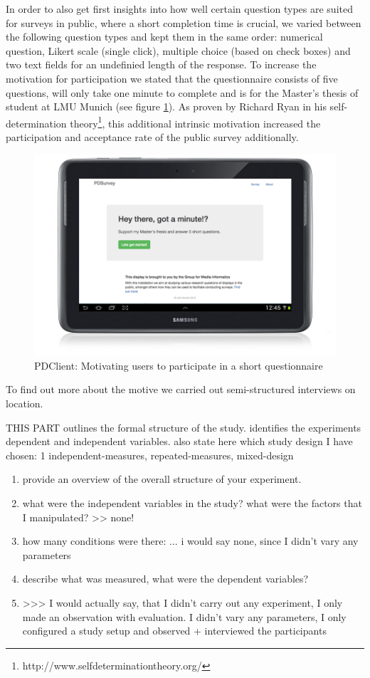 	In order to also get first insights into how well certain question types are suited for surveys in public, where a short completion time is crucial, we varied between the following question types and kept them in the same order: numerical question, Likert scale (single click), multiple choice (based on check boxes) and two text fields for an undefinied length of the response. To increase the motivation for participation we stated that the questionnaire consists of five questions, will only take one minute to complete and is for the Master's thesis of student at LMU Munich (see figure \ref{fig:5-pdclient-intro}).
	As proven by Richard Ryan in his self-determination theory\cite{ryan2000self}\footnote{http://www.selfdeterminationtheory.org/}, this additional intrinsic motivation increased the participation and acceptance rate of the public survey additionally. 

	\begin{figure}
	    \begin{center}
	        \includegraphics[width=.7\columnwidth]{img/5_field-study/pdclient-startscreen.png}
	    \end{center}
	 \caption{PDClient: Motivating users to participate in a short questionnaire}
	 \label{fig:5-pdclient-intro}
	\end{figure}

	To find out more about the motive we carried out semi-structured interviews on location.



	THIS PART outlines the formal structure of the study. identifies the experiments dependent and independent variables.
	also state here which study design I have chosen: 1 independent-measures, repeated-measures, mixed-design

		\begin{enumerate}
		\item provide an overview of the overall structure of your experiment. 
		\item what were the independent variables in the study? what were the factors that I manipulated? >> none! 
		\item how many conditions were there: ... i would say none, since I didn't vary any parameters
		\item describe what was measured, what were the dependent variables?
		\item >>> I would actually say, that I didn't carry out any experiment, I only made an observation with evaluation. I didn't vary any parameters, I only configured a study setup and observed + interviewed the participants
		\end{enumerate}


